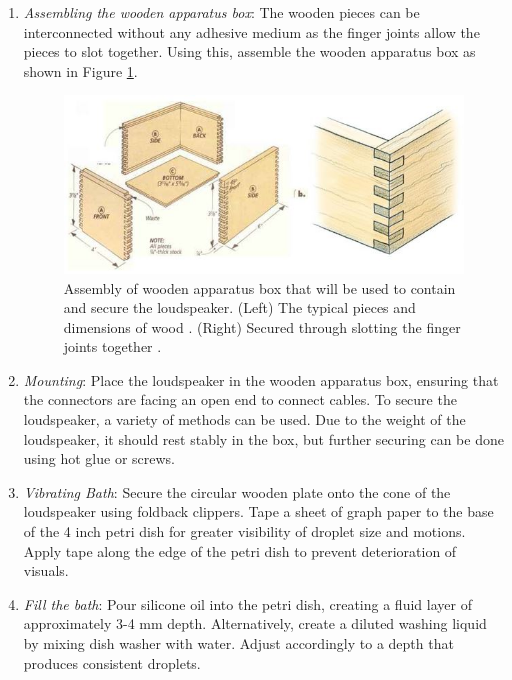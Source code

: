 \begin{enumerate}

\item \textit{Assembling the wooden apparatus box}: The wooden pieces can be interconnected without any adhesive medium as the finger joints allow the pieces to slot together. Using this, assemble the wooden apparatus box as shown in Figure \ref{fig:WoodenBox}.

\begin{figure}[h]
    \centering
    \includegraphics[width=\textwidth]{prototype/WoodenBox.jpg}
    \caption{Assembly of wooden apparatus box that will be used to contain and secure the loudspeaker. (Left) The typical pieces and dimensions of wood \cite{boxdimensions}. (Right)  Secured through slotting the finger joints together \cite{fingerjoints}.}
    \label{fig:WoodenBox}
\end{figure}

\item  \textit{Mounting}: Place the loudspeaker in the wooden apparatus box, ensuring that the connectors are facing an open end to connect cables. To secure the loudspeaker, a variety of methods can be used. Due to the weight of the loudspeaker, it should rest stably in the box, but further securing can be done using hot glue or screws.

\item  \textit{Vibrating Bath}: Secure the circular wooden plate onto the cone of the loudspeaker using foldback clippers. Tape a sheet of graph paper to the base of the 4 inch petri dish for greater visibility of droplet size and motions. Apply tape along the edge of the petri dish to prevent deterioration of visuals.

\item  \textit{Fill the bath}: Pour silicone oil into the petri dish, creating a fluid layer of approximately 3-4 mm depth. Alternatively, create a diluted washing liquid by mixing dish washer with water. Adjust accordingly to a depth that produces consistent droplets.


\end{enumerate}
